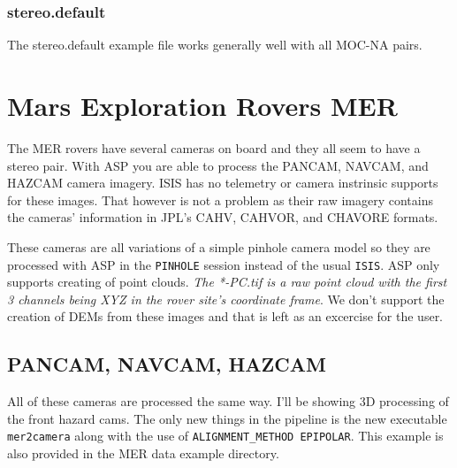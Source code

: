 \subsubsection*{stereo.default}

The stereo.default example file works generally well with all MOC-NA pairs.

\clearpage
\section{Mars Exploration Rovers MER}

The MER rovers have several cameras on board and they all seem to have
a stereo pair. With ASP you are able to process the PANCAM, NAVCAM,
and HAZCAM camera imagery. ISIS has no telemetry or camera instrinsic
supports for these images. That however is not a problem as their raw
imagery contains the cameras' information in JPL's CAHV, CAHVOR, and
CHAVORE formats.

These cameras are all variations of a simple pinhole camera model so
they are processed with ASP in the \texttt{PINHOLE} session instead of
the usual \texttt{ISIS}. ASP only supports creating of point
clouds. \emph{The *-PC.tif is a raw point cloud with the first 3
  channels being XYZ in the rover site's coordinate frame}. We don't
support the creation of DEMs from these images and that is left as an
excercise for the user.

\subsection{PANCAM, NAVCAM, HAZCAM}

All of these cameras are processed the same way. I'll be showing 3D
processing of the front hazard cams. The only new things in the
pipeline is the new executable \texttt{mer2camera} along with the use
of \texttt{ALIGNMENT\_METHOD EPIPOLAR}. This example is also provided
in the MER data example directory.

